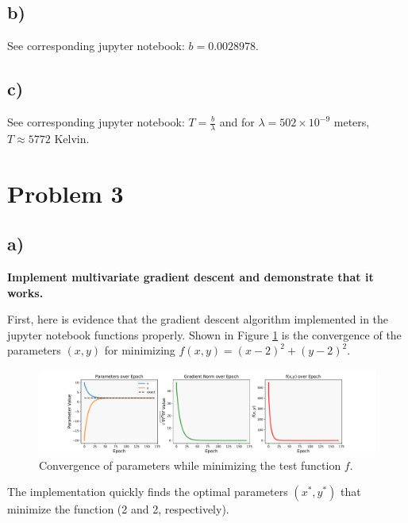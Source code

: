\documentclass{article}
\begin{document}
\subsection*{b)} See corresponding jupyter notebook: $b = 0.0028978$.


\subsection*{c)} See corresponding jupyter notebook: $T = \frac{b}{\lambda}$ and for $\lambda = 502 \times 10^{-9}$ meters, $T \approx 5772 $ Kelvin.

\section{Problem 3}

\subsection*{a)}
{\bf Implement multivariate gradient descent and demonstrate that it works.}
\\
\par First, here is evidence that the gradient descent algorithm implemented in the jupyter notebook functions properly.  Shown in Figure \ref{grad_test} is the convergence of the parameters $(x,y)$ for minimizing $f(x,y) = (x-2)^2 + (y-2)^2$.
\begin{figure}[t]
  \centering
    \includegraphics[width=1.0\textwidth]{gradient_test.pdf}
      \caption{Convergence of parameters while minimizing the test function $f$.}
    \label{grad_test}
\end{figure}
The implementation quickly finds the optimal parameters $(x^*, y^*)$ that minimize the function (2 and 2, respectively).
\end{document}
